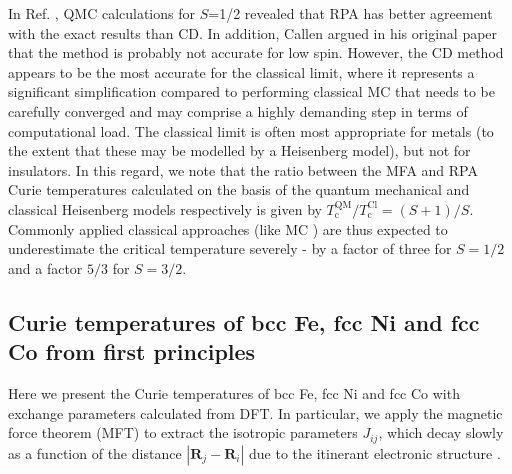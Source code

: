\documentclass[aps,prb,reprint,floatfix,superscriptaddress]{revtex4-2}
\begin{document}
In Ref. \cite{FROBRICH2006223}, QMC calculations for $S$=1/2 revealed that RPA has better agreement with the exact results than CD. In addition, Callen argued in his original paper that the method is probably not accurate for low spin. However, the CD method appears to be the most accurate for the classical limit, where it represents a significant simplification compared to performing classical MC that needs to be carefully converged and may comprise a highly demanding step in terms of computational load. The classical limit is often most appropriate for metals (to the extent that these may be modelled by a Heisenberg model), but not for insulators. In this regard, we note that the ratio between the MFA and RPA Curie temperatures calculated on the basis of the quantum mechanical and classical Heisenberg models respectively is given by $T_\mathrm{c}^\mathrm{QM}/T_\mathrm{c}^\mathrm{Cl}=(S+1)/S$. Commonly applied classical approaches (like MC \cite{Torelli_2019}) are thus expected to underestimate the critical temperature severely - by a factor of three for $S=1/2$ and a factor $5/3$ for $S=3/2$.

\subsection{Curie temperatures of bcc Fe, fcc Ni and fcc Co from first principles}
Here we present the Curie temperatures of bcc Fe, fcc Ni and fcc Co with exchange parameters calculated from DFT. In particular, we apply the magnetic force theorem (MFT) to extract the isotropic parameters $J_{ij}$, which decay slowly as a function of the distance $|\mathbf{R}_j-\mathbf{R}_i|$ due to the itinerant electronic structure \cite{Pajda2001}. 
\end{document}
